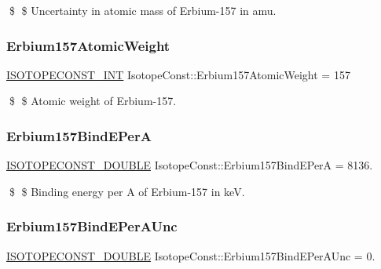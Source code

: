 \$ \$ Uncertainty in atomic mass of Erbium-\/157 in amu. \mbox{\label{group___isotope_const-_erbium-_er157_ga202f72fd10c318b456c1ce90b785f4d1}} 
\subsubsection{\texorpdfstring{Erbium157\+Atomic\+Weight}{Erbium157AtomicWeight}}
{\footnotesize\ttfamily \mbox{\hyperlink{group___isotope_const-_macros_ga5f18360b3e99483a35c32d789e62621c}{I\+S\+O\+T\+O\+P\+E\+C\+O\+N\+S\+T\+\_\+\+I\+NT}} Isotope\+Const\+::\+Erbium157\+Atomic\+Weight = 157}

\$ \$ Atomic weight of Erbium-\/157. \mbox{\label{group___isotope_const-_erbium-_er157_gac3657f8ee53b72e425e40c2297268a18}} 
\subsubsection{\texorpdfstring{Erbium157\+Bind\+E\+PerA}{Erbium157BindEPerA}}
{\footnotesize\ttfamily \mbox{\hyperlink{group___isotope_const-_macros_ga8f45a7272ce02c0b4c65c44636ed719a}{I\+S\+O\+T\+O\+P\+E\+C\+O\+N\+S\+T\+\_\+\+D\+O\+U\+B\+LE}} Isotope\+Const\+::\+Erbium157\+Bind\+E\+PerA = 8136.}

\$ \$ Binding energy per A of Erbium-\/157 in keV. \mbox{\label{group___isotope_const-_erbium-_er157_gaecddb25202f2a8a3b80fdaf1d3279ad8}} 
\subsubsection{\texorpdfstring{Erbium157\+Bind\+E\+Per\+A\+Unc}{Erbium157BindEPerAUnc}}
{\footnotesize\ttfamily \mbox{\hyperlink{group___isotope_const-_macros_ga8f45a7272ce02c0b4c65c44636ed719a}{I\+S\+O\+T\+O\+P\+E\+C\+O\+N\+S\+T\+\_\+\+D\+O\+U\+B\+LE}} Isotope\+Const\+::\+Erbium157\+Bind\+E\+Per\+A\+Unc = 0.}

